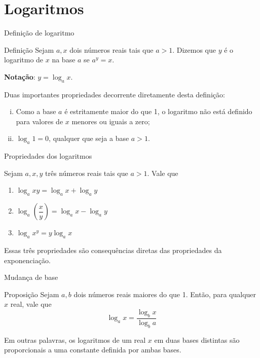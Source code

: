 \section*{Logaritmos}

\begin{frame}[fragile]{Definição de logaritmo}

    \begin{block}{Definição}
        Sejam $a, x$ dois números reais tais que $a > 1$. Dizemos que $y$ é o logaritmo de $x$ na base $a$ se $a^y = x$.

        \textbf{Notação}: $y = \log_a x$.
    \end{block}

    \vspace{0.2in}

    Duas importantes propriedades decorrente diretamente desta definição:

    \begin{enumerate}[(i)]
        \item Como a base $a$ é estritamente maior do que 1, o logaritmo não está definido para valores de $x$ menores ou iguais a zero;
        \item $\log_a 1 = 0$, qualquer que seja a base $a > 1$.
    \end{enumerate}

\end{frame}

\begin{frame}[fragile]{Propriedades dos logaritmos}

    Sejam $a, x, y$ três números reais tais que $a > 1$. Vale que

    \begin{enumerate}
        \item $\log_a xy = \log_a x + \log_a y$
        \item $\log_a \left(\dfrac{x}{y}\right) = \log_a x - \log_a y$
        \item $\log_a x^y = y\log_a x$
    \end{enumerate}

    Essas três propriedades são consequências diretas das propriedades da exponenciação.
\end{frame}

\begin{frame}[fragile]{Mudança de base}

    \begin{block}{Proposição}
        Sejam $a, b$ dois números reais maiores do que 1. Então, para qualquer $x$ real, vale que
        $$
            \log_a x = \frac{\log_b x}{\log_b a}
        $$
    \end{block}

    \vspace{0.2in}

    Em outras palavras, os logaritmos de um real $x$ em duas bases distintas são proporcionais a uma constante definida por ambas bases.
\end{frame}

